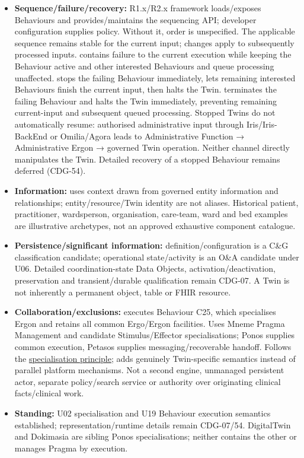 \begin{itemize}
\item \textbf{Sequence/failure/recovery:} R1.x/R2.x framework loads/exposes Behaviours and
  provides/maintains the sequencing API; developer configuration supplies policy.
  Without it, order is unspecified. The applicable sequence remains stable for
  the current input; changes apply to subsequently processed inputs.
  \texttt{} contains failure to the current execution while
  keeping the Behaviour active and other interested Behaviours and queue processing
  unaffected. \texttt{} stops the failing Behaviour immediately,
  lets remaining interested Behaviours finish the current input, then halts the
  Twin. \texttt{} terminates the failing Behaviour and halts the
  Twin immediately, preventing remaining current-input and subsequent queued
  processing. Stopped Twins do not
  automatically resume: authorised administrative input through Iris/Iris-BackEnd
  or Omilia/Agora leads to Administrative Function → Administrative Ergon →
  governed Twin operation. Neither channel directly manipulates the Twin.
  Detailed recovery of a stopped Behaviour remains deferred (CDG-54).

\item \textbf{Information:} uses context drawn from governed entity information and
  relationships; entity/resource/Twin identity are not aliases. Historical patient,
  practitioner, wardsperson, organisation, care-team, ward and bed examples are
  illustrative archetypes, not an approved exhaustive component catalogue.

\item \textbf{Persistence/significant information:} definition/configuration is a C\&G
  classification candidate; operational state/activity is an O\&A candidate under
  U06. Detailed coordination-state Data Objects, activation/deactivation,
  preservation and transient/durable qualification remain CDG-07. A Twin is not
  inherently a permanent object, table or FHIR resource.

\item \textbf{Collaboration/exclusions:} executes Behaviour C25, which specialises Ergon
  and retains all common Ergo/Ergon facilities. Uses Mneme Pragma Management and
  candidate Stimulus/Effector specialisations; Ponos supplies common execution,
  Petasos supplies messaging/recoverable handoff. Follows the
  \href{\detokenize{../../../../../../../../../docs/markdown/05-information-systems-architecture/README.md#specialisation-principle}}{specialisation principle}; adds genuinely
  Twin-specific semantics instead of parallel platform mechanisms.
  Not a second engine, unmanaged persistent actor, separate
  policy/search service or authority over originating clinical facts/clinical work.

\item \textbf{Standing:} U02 specialisation and U19 Behaviour execution semantics established;
  representation/runtime details remain CDG-07/54. DigitalTwin and Dokimasia are sibling
  Ponos specialisations; neither contains the other or manages Pragma by execution.

\end{itemize}

